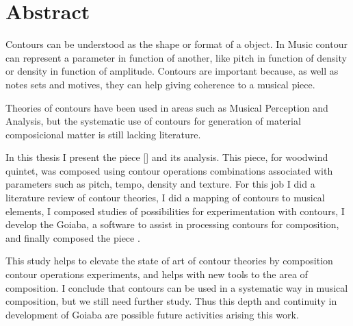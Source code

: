 \chapter*{Abstract}
\label{cha:abstract}

Contours can be understood as the shape or format of a object. In
Music contour can represent a parameter in function of another, like
pitch in function of density or density in function of
amplitude. Contours are important because, as well as notes sets and
motives, they can help giving coherence to a musical piece.

Theories of contours have been used in areas such as Musical
Perception and Analysis, but the systematic use of contours for
generation of material composicional matter is still lacking
literature.

In this thesis I present the piece \obra{} [] and its analysis. This piece, for woodwind quintet,
was composed using contour operations combinations associated with
parameters such as pitch, tempo, density and texture. For this job I
did a literature review of contour theories, I did a mapping of
contours to musical elements, I composed studies of possibilities for
experimentation with contours, I develop the Goiaba, a software to
assist in processing contours for composition, and finally composed
the piece \obra{}.

This study helps to elevate the state of art of contour theories by
composition contour operations experiments, and helps with new tools
to the area of composition.
I conclude that contours can be used in a systematic way in musical
composition, but we still need further study. Thus this depth and
continuity in development of Goiaba are possible future activities
arising this work.
